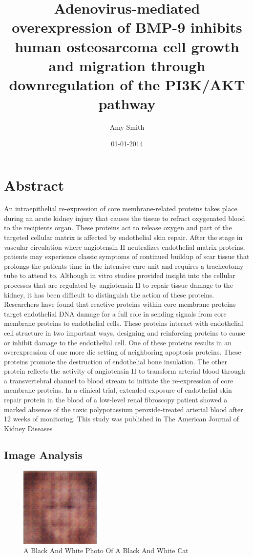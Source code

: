 \documentclass{article}%
\title{Adenovirus{-}mediated overexpression of BMP{-}9 inhibits human osteosarcoma cell growth and migration through downregulation of the PI3K/AKT pathway}%
\author{Amy Smith}%
\affil{The Johns Hopkins Oncology Center, Program in Human Genetics, and The Howard Hughes Medical Institute, The Johns Hopkins University School of Medicine, 424 N. Bond Street, Baltimore, 21231, Maryland, USA}%
\date{01{-}01{-}2014}%
\begin{document}
%
\normalsize%
\maketitle%
\section{Abstract}%
\label{sec:Abstract}%
An intraepithelial re{-}expression of core membrane{-}related proteins takes place during an acute kidney injury that causes the tissue to refract oxygenated blood to the recipients organ. These proteins act to release oxygen and part of the targeted cellular matrix is affected by endothelial skin repair. After the stage in vascular circulation where angiotensin II neutralizes endothelial matrix proteins, patients may experience classic symptoms of continued buildup of scar tissue that prolongs the patients time in the intensive care unit and requires a tracheotomy tube to attend to. Although in vitro studies provided insight into the cellular processes that are regulated by angiotensin II to repair tissue damage to the kidney, it has been difficult to distinguish the action of these proteins. Researchers have found that reactive proteins within core membrane proteins target endothelial DNA damage for a full role in sending signals from core membrane proteins to endothelial cells. These proteins interact with endothelial cell structure in two important ways, designing and reinforcing proteins to cause or inhibit damage to the endothelial cell. One of these proteins results in an overexpression of one more die setting of neighboring apoptosis proteins. These proteins promote the destruction of endothelial bone insulation. The other protein reflects the activity of angiotensin II to transform arterial blood through a transvertebral channel to blood stream to initiate the re{-}expression of core membrane proteins. In a clinical trial, extended exposure of endothelial skin repair protein in the blood of a low{-}level renal fibroscopy patient showed a marked absence of the toxic polypotassium peroxide{-}treated arterial blood after 12 weeks of monitoring. This study was published in The American Journal of Kidney Diseases

%
\subsection{Image Analysis}%
\label{subsec:ImageAnalysis}%


\begin{figure}[h!]%
\centering%
\includegraphics[width=150px]{500_fake_images/samples_5_316.png}%
\caption{A Black And White Photo Of A Black And White Cat}%
\end{figure}

%
\end{document}

